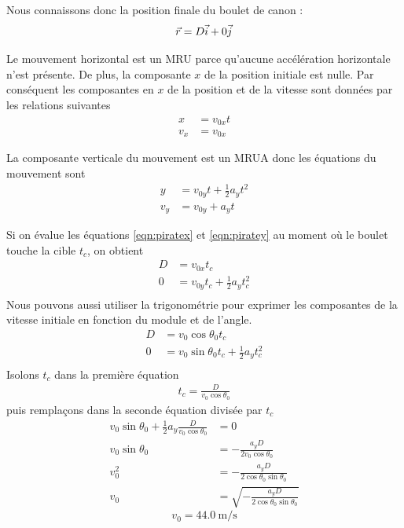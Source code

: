 Nous connaissons donc la position finale du boulet de canon :
\[
  \vec{r} = D\vec{i} + 0\vec{j}
\]

Le mouvement horizontal est un MRU parce qu'aucune accélération horizontale
n'est présente.  De plus, la composante $x$ de la position initiale est nulle.
Par conséquent les composantes en $x$ de la position et de la vitesse sont
données par les relations suivantes
\begin{align}
  x   &= v_{0x} t \label{eqn:piratex} \\
  v_x &= v_{0x} \label{eqn:piratevx}
\end{align}

La composante verticale du mouvement est un MRUA donc les équations du mouvement
sont
\begin{align}
  y   &= v_{0y} t + \frac{1}{2} a_y t^2 \label{eqn:piratey} \\
  v_y &= v_{0y} + a_y t \label{eqn:piratevy}
\end{align}

Si on évalue les équations \ref{eqn:piratex} et \ref{eqn:piratey} au moment où
le boulet touche la cible $t_c$, on obtient
\begin{align*}
  D &= v_{0x}t_c \\
  0 &= v_{0y} t_c + \frac{1}{2} a_y t_c^2 \\
\end{align*}
Nous pouvons aussi utiliser la trigonométrie pour exprimer les composantes de
la vitesse initiale en fonction du module et de l'angle.
\begin{align*}
  D &= v_{0}\cos\theta_0 t_c \\
  0 &= v_{0}\sin\theta_0 t_c + \frac{1}{2} a_y t_c^2 \\
\end{align*}
Isolons $t_c$ dans la première équation
\begin{align*}
  t_c = \frac{D}{v_0\cos\theta_0} 
\end{align*}
puis remplaçons dans la seconde équation divisée par $t_c$
\begin{align*}
  v_0 \sin\theta_0 + \frac{1}{2} a_y \frac{D}{v_0\cos\theta_0} &= 0 \\
  v_0 \sin\theta_0 &= -\frac{a_y D}{2v_0 \cos\theta_0} \\
  v_0^2 &= -\frac{a_y D}{2\cos\theta_0\sin\theta_0} \\
  v_0 &= \sqrt{-\frac{a_y D}{2\cos\theta_0\sin\theta_0}}
\end{align*}
\[
  \boxed{v_0 = \SI{44.0}{\meter\per\second}}
\]


